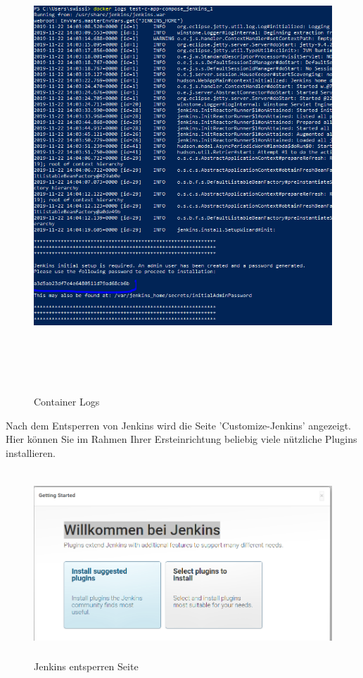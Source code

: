 \documentclass[a4paper,12pt,oneside]{book}
\begin{document}
\begin{figure}[h!]
	\begin{center}
		\includegraphics[width=15cm, height=17cm]{jenkins-logs.PNG}
		\caption{Container Logs} 
		\label{Container Logs} 
	\end{center}
\end{figure}
\newpage
Nach dem Entsperren von Jenkins wird die Seite 'Customize-Jenkins' angezeigt. Hier können Sie im Rahmen Ihrer Ersteinrichtung beliebig viele nützliche Plugins installieren.
\begin{figure}[h!]
	\begin{center}
		\includegraphics[width=17cm, height=7cm]{customize-jenkins.PNG}
		\caption{Jenkins entsperren Seite} 
		\label{Jenkins entsperren Seite} 
	\end{center}
\end{figure}
\end{document}
